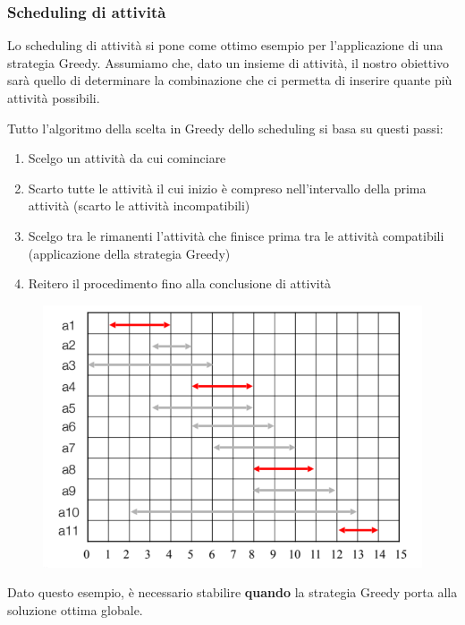 \documentclass{article}
\begin{document}
\subsubsection{Scheduling di attività} Lo scheduling di attività si pone come ottimo esempio per l'applicazione di una strategia Greedy. Assumiamo che, dato un insieme di attività, il nostro obiettivo sarà quello di determinare la combinazione che ci permetta di inserire quante più attività possibili.

Tutto l'algoritmo della scelta in Greedy dello scheduling si basa su questi passi:

\begin{enumerate}
    \item Scelgo un attività da cui cominciare
    \item Scarto tutte le attività il cui inizio è compreso nell'intervallo della prima attività (scarto le attività incompatibili)
    \item Scelgo tra le rimanenti l'attività che finisce prima tra le attività compatibili (applicazione della strategia Greedy)
    \item Reitero il procedimento fino alla conclusione di attività
\end{enumerate}

\begin{figure}[htbp]
        \center
        \includegraphics[scale=0.5]{img/greedy3.png}
\end{figure}

Dato questo esempio, è necessario stabilire \textbf{quando} la strategia Greedy porta alla soluzione ottima globale.

\newpage
\end{document}

